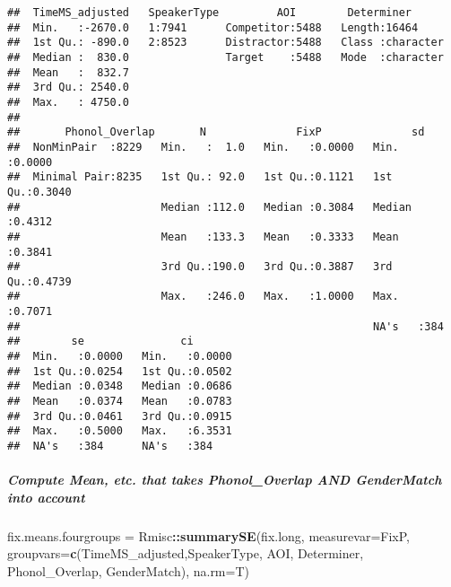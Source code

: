 \documentclass[
]{article}
\newenvironment{Shaded}{\begin{snugshade}}{\end{snugshade}}
\newcommand{\AttributeTok}[1]{\textcolor[rgb]{0.13,0.29,0.53}{#1}}
\newcommand{\FunctionTok}[1]{\textcolor[rgb]{0.13,0.29,0.53}{\textbf{#1}}}
\newcommand{\NormalTok}[1]{#1}
\newcommand{\OtherTok}[1]{\textcolor[rgb]{0.56,0.35,0.01}{#1}}
\newcommand{\SpecialCharTok}[1]{\textcolor[rgb]{0.81,0.36,0.00}{\textbf{#1}}}
\newcommand{\StringTok}[1]{\textcolor[rgb]{0.31,0.60,0.02}{#1}}
\begin{document}
\begin{verbatim}
##  TimeMS_adjusted   SpeakerType         AOI        Determiner       
##  Min.   :-2670.0   1:7941      Competitor:5488   Length:16464      
##  1st Qu.: -890.0   2:8523      Distractor:5488   Class :character  
##  Median :  830.0               Target    :5488   Mode  :character  
##  Mean   :  832.7                                                   
##  3rd Qu.: 2540.0                                                   
##  Max.   : 4750.0                                                   
##                                                                    
##       Phonol_Overlap       N              FixP              sd        
##  NonMinPair  :8229   Min.   :  1.0   Min.   :0.0000   Min.   :0.0000  
##  Minimal Pair:8235   1st Qu.: 92.0   1st Qu.:0.1121   1st Qu.:0.3040  
##                      Median :112.0   Median :0.3084   Median :0.4312  
##                      Mean   :133.3   Mean   :0.3333   Mean   :0.3841  
##                      3rd Qu.:190.0   3rd Qu.:0.3887   3rd Qu.:0.4739  
##                      Max.   :246.0   Max.   :1.0000   Max.   :0.7071  
##                                                       NA's   :384     
##        se               ci        
##  Min.   :0.0000   Min.   :0.0000  
##  1st Qu.:0.0254   1st Qu.:0.0502  
##  Median :0.0348   Median :0.0686  
##  Mean   :0.0374   Mean   :0.0783  
##  3rd Qu.:0.0461   3rd Qu.:0.0915  
##  Max.   :0.5000   Max.   :6.3531  
##  NA's   :384      NA's   :384
\end{verbatim}

\subparagraph{Compute Mean, etc. that takes Phonol\_Overlap AND
GenderMatch into
account}\label{compute-mean-etc.-that-takes-phonol_overlap-and-gendermatch-into-account}

\begin{Shaded}
\begin{Highlighting}[]
\NormalTok{fix.means.fourgroups }\OtherTok{=}\NormalTok{ Rmisc}\SpecialCharTok{::}\FunctionTok{summarySE}\NormalTok{(fix.long, }\AttributeTok{measurevar=}\StringTok{\textquotesingle{}FixP\textquotesingle{}}\NormalTok{, }\AttributeTok{groupvars=}\FunctionTok{c}\NormalTok{(}\StringTok{\textquotesingle{}TimeMS\_adjusted\textquotesingle{}}\NormalTok{,}\StringTok{\textquotesingle{}SpeakerType\textquotesingle{}}\NormalTok{, }\StringTok{\textquotesingle{}AOI\textquotesingle{}}\NormalTok{, }\StringTok{\textquotesingle{}Determiner\textquotesingle{}}\NormalTok{, }\StringTok{\textquotesingle{}Phonol\_Overlap\textquotesingle{}}\NormalTok{, }\StringTok{\textquotesingle{}GenderMatch\textquotesingle{}}\NormalTok{), }\AttributeTok{na.rm=}\NormalTok{T)}
\end{Highlighting}
\end{Shaded}
\end{document}
